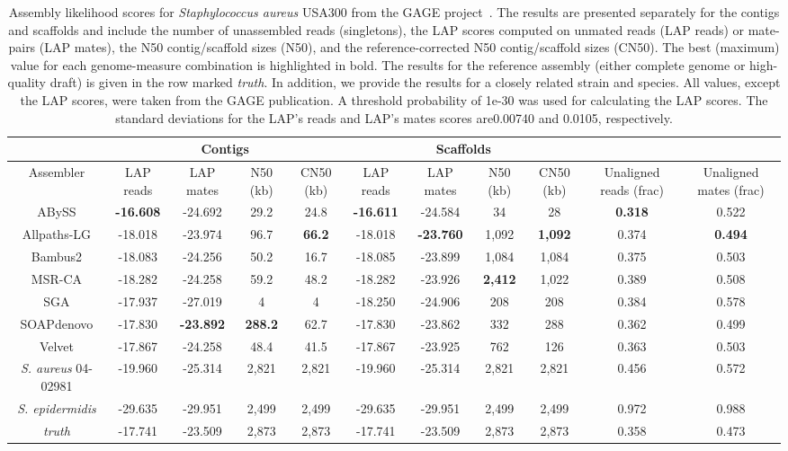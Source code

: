 \documentclass[12pt,\mydriver]{thesis}
\begin{document}
\begin{landscape}
\renewcommand{\baselinestretch}{1}
\small\normalsize
\begin{table}[tb!]
\centering
\tiny
\begin{tabular}{|c|c|c|c|c|c|c|c|c|c|c|}
\hline
 & \multicolumn{4}{c|}{Contigs} & \multicolumn{4}{c|}{Scaffolds} & &\\
\hline
Assembler & LAP reads & LAP mates & N50 (kb) & CN50 (kb) & LAP reads & LAP mates & N50 (kb) & CN50 (kb) & Unaligned reads (frac) & Unaligned mates (frac)\\
\hline
ABySS & {\bf -16.608} & -24.692 & 29.2 & 24.8 & {\bf -16.611} & -24.584 & 34 & 28 & {\bf 0.318} & 0.522\\
Allpaths-LG & -18.018 & -23.974 & 96.7 & {\bf 66.2} & -18.018 & {\bf -23.760} & 1,092 & {\bf 1,092} & 0.374 & {\bf 0.494}\\
Bambus2 & -18.083 & -24.256 & 50.2 & 16.7 & -18.085 & -23.899 & 1,084 & 1,084 & 0.375 & 0.503\\
MSR-CA & -18.282 & -24.258 & 59.2 & 48.2 & -18.282 & -23.926 & {\bf 2,412} & 1,022 & 0.389 & 0.508\\
SGA & -17.937 & -27.019 & 4 & 4 & -18.250 & -24.906 & 208 & 208 & 0.384 & 0.578\\
SOAPdenovo & -17.830 & {\bf -23.892} & {\bf 288.2} & 62.7 & -17.830 & -23.862 & 332 & 288 & 0.362 & 0.499\\
Velvet & -17.867 & -24.258 & 48.4 & 41.5 & -17.867 & -23.925 & 762 & 126 & 0.363 & 0.503\\
\emph{S. aureus} 04-02981 & -19.960 & -25.314 & 2,821 & 2,821 & -19.960 & -25.314 & 2,821 & 2,821 & 0.456 & 0.572\\
\emph{S. epidermidis} & -29.635 & -29.951 & 2,499 & 2,499 & -29.635 & -29.951 & 2,499 & 2,499 & 0.972 & 0.988\\
\emph{truth}  & -17.741 & -23.509 & 2,873 & 2,873 & -17.741 & -23.509 & 2,873 & 2,873 & 0.358 & 0.473\\
\hline
\end{tabular}
\caption[\emph{Staphylococcus aureus} USA300 assembly evaluation.]{Assembly likelihood scores for \emph{Staphylococcus
aureus} USA300 from the GAGE project~\cite{earl2011assemblathon}.
The results are presented
separately for the contigs and scaffolds and include the number of
unassembled reads (singletons), the LAP scores computed on unmated reads (LAP reads) or
mate-pairs (LAP mates), the N50 contig/scaffold sizes (N50),
and the reference-corrected N50 contig/scaffold sizes (CN50).
The best (maximum) value for each
genome-measure combination is highlighted in bold.
The results for the reference
assembly (either complete genome or high-quality draft) is given in the row
marked \emph{truth}.  In addition, we
provide the results for a closely related strain and species.
All values, except the LAP scores, were taken from the
GAGE publication. A threshold probability of 1e-30 was used for calculating the LAP scores. The standard deviations for the LAP's reads and LAP's mates scores are0.00740 and 0.0105, respectively.}
\label{tab:staph}
\end{table}
\renewcommand{\baselinestretch}{2}
\small\normalsize
\end{landscape}
\end{document}
